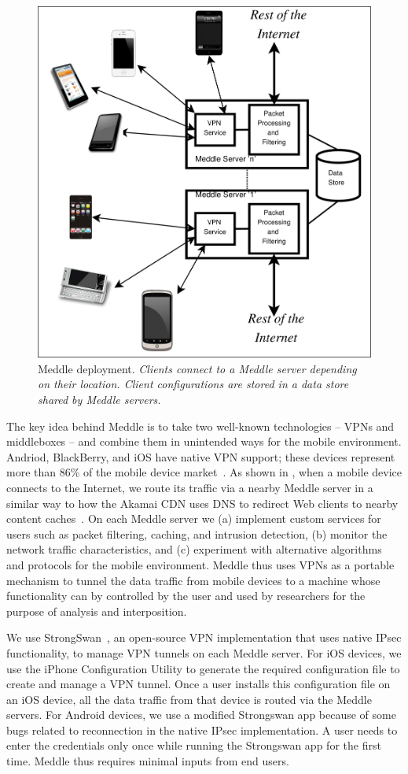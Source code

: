 \documentclass{sig-alternate-10pt}
\newcommand{\meddle}{{Meddle}\xspace}
\renewcommand{\fref}{\Fref}
\begin{document}
\begin{figure}
  \centering
  \includegraphics[width=0.6\columnwidth]{figures/meddle-servers.pdf}
  \caption{Meddle deployment. \emph{Clients connect to a \meddle
      server depending on their location. Client configurations are
      stored in a data store shared by \meddle servers.}} 
  \label{fig:MeddleDeployment}
\end{figure}

The key idea behind \meddle is to take two well-known technologies --
VPNs and middleboxes -- and combine them in unintended 
ways for the mobile environment. Andriod, BlackBerry, and iOS have
native VPN support; these devices represent more than 86\% of the
mobile device market~\cite{gartner-phone-share}. As shown in
\fref{fig:MeddleDeployment}, when a mobile device connects to the
Internet, we route its traffic via a nearby \meddle server in a
similar way to how the Akamai CDN uses DNS to redirect Web clients to
nearby content caches~\cite{akamai:cdn}. On each \meddle server we (a)
implement custom services for users such as packet filtering, caching,
and intrusion detection, (b) monitor the network traffic
characteristics, and (c) experiment with alternative algorithms and
protocols for the mobile environment. \meddle thus uses VPNs as a
portable mechanism to tunnel the data traffic from mobile devices to a
machine whose functionality can by controlled by the user and used by
researchers for the purpose of analysis and interposition.     

We use StrongSwan~\cite{strongswan}, an open-source VPN implementation
that uses native IPsec functionality, to manage VPN tunnels on each
\meddle server. For iOS devices, we use the iPhone Configuration
Utility to generate the required configuration file to create and
manage a VPN tunnel. Once a user installs this configuration file on
an iOS device, all the data traffic from that device is routed via the 
\meddle servers. For Android devices, we use a modified Strongswan app
because of some bugs related to reconnection in the native IPsec
implementation. A user needs to enter the credentials only once while
running the Strongswan app for the first time. \meddle thus requires
minimal inputs from end users.    
\end{document}
